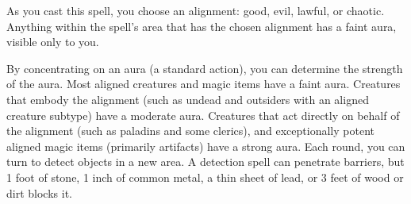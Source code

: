 \spellline
\spelleffect As you cast this spell, you choose an alignment: good, evil, lawful, or chaotic. Anything within the spell's area that has the chosen alignment has a faint aura, visible only to you.

By concentrating on an aura (a standard action), you can determine the strength of the aura. Most aligned creatures and magic items have a faint aura. Creatures that embody the alignment (such as undead and outsiders with an aligned creature subtype) have a moderate aura. Creatures that act directly on behalf of the alignment (such as paladins and some clerics), and exceptionally potent aligned magic items (primarily artifacts) have a strong aura.
\spellnotes Each round, you can turn to detect objects in a new area. A detection spell can penetrate barriers, but 1 foot of stone, 1 inch of common metal, a thin sheet of lead, or 3 feet of wood or dirt blocks it.

